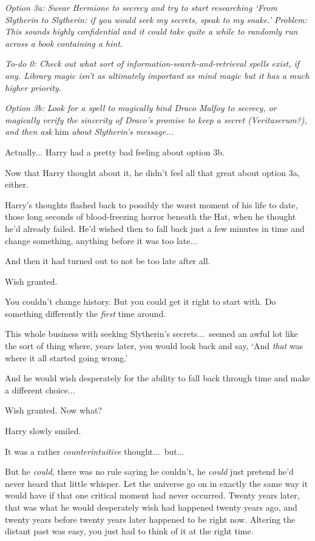 \emph{Option 3a: Swear Hermione to secrecy and try to start researching ‘From Slytherin to Slytherin: if you would seek my secrets, speak to my snake.’ Problem: This sounds highly confidential and it could take quite a while to randomly run across a book containing a hint.}

\emph{To-do 0: Check out what sort of information-search-and-retrieval spells exist, if any. Library magic isn’t as ultimately important as mind magic but it has a much higher priority.}

\emph{Option 3b: Look for a spell to magically bind Draco Malfoy to secrecy, or magically verify the sincerity of Draco’s promise to keep a secret (Veritaserum?), and then ask} him \emph{about Slytherin’s message...}

Actually... Harry had a pretty bad feeling about option 3b.

Now that Harry thought about it, he didn’t feel all that great about option 3a, either.

Harry’s thoughts flashed back to possibly the worst moment of his life to date, those long seconds of blood-freezing horror beneath the Hat, when he thought he’d already failed. He’d wished then to fall back just a few minutes in time and change something, anything before it was too late...

And then it had turned out to not be too late after all.

Wish granted.

You couldn’t change history. But you could get it right to start with. Do something differently the \emph{first} time around.

This whole business with seeking Slytherin’s secrets...\ seemed an awful lot like the sort of thing where, years later, you would look back and say, ‘And \emph{that} was where it all started going wrong.’

And he would wish desperately for the ability to fall back through time and make a different choice...

Wish granted. Now what?

Harry slowly smiled.

It was a rather \emph{counterintuitive} thought...\ but...

But he \emph{could,} there was no rule saying he couldn’t, he \emph{could} just pretend he’d never heard that little whisper. Let the universe go on in exactly the same way it would have if that one critical moment had never occurred. Twenty years later, that was what he would desperately wish had happened twenty years ago, and twenty years before twenty years later happened to be right now. Altering the distant past was easy, you just had to think of it at the right time.

